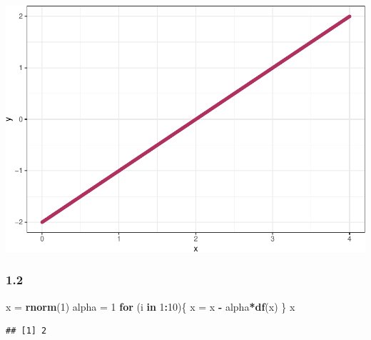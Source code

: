 \documentclass[]{article}
\newenvironment{Shaded}{\begin{snugshade}}{\end{snugshade}}
\newcommand{\KeywordTok}[1]{\textcolor[rgb]{0.13,0.29,0.53}{\textbf{#1}}}
\newcommand{\DataTypeTok}[1]{\textcolor[rgb]{0.13,0.29,0.53}{#1}}
\newcommand{\DecValTok}[1]{\textcolor[rgb]{0.00,0.00,0.81}{#1}}
\newcommand{\StringTok}[1]{\textcolor[rgb]{0.31,0.60,0.02}{#1}}
\newcommand{\ControlFlowTok}[1]{\textcolor[rgb]{0.13,0.29,0.53}{\textbf{#1}}}
\newcommand{\OperatorTok}[1]{\textcolor[rgb]{0.81,0.36,0.00}{\textbf{#1}}}
\newcommand{\NormalTok}[1]{#1}
\begin{document}
\begin{Shaded}
\end{Shaded}

\includegraphics{lab3_files/figure-latex/unnamed-chunk-1-2.pdf}

\subsubsection*{1.2}

\begin{Shaded}
\begin{Highlighting}[]
\NormalTok{x =}\StringTok{ }\KeywordTok{rnorm}\NormalTok{(}\DecValTok{1}\NormalTok{)}
\NormalTok{alpha =}\StringTok{ }\DecValTok{1}
\ControlFlowTok{for}\NormalTok{ (i }\ControlFlowTok{in} \DecValTok{1}\OperatorTok{:}\DecValTok{10}\NormalTok{)\{}
\NormalTok{  x =}\StringTok{ }\NormalTok{x }\OperatorTok{-}\StringTok{ }\NormalTok{alpha}\OperatorTok{*}\KeywordTok{df}\NormalTok{(x)}
\NormalTok{\}}
\NormalTok{x}
\end{Highlighting}
\end{Shaded}

\begin{verbatim}
## [1] 2
\end{verbatim}
\end{document}
